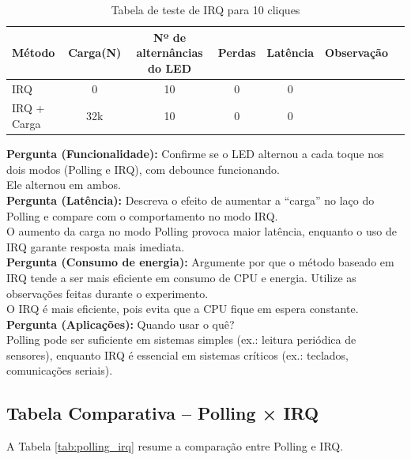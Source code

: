 \documentclass{article}
\begin{document}
\begin{table}[ht!]
    \centering
    \begin{tabular}{lcccccc}
        \toprule
         Método & Carga(N) & Nº de alternâncias do LED & Perdas & Latência & Observação\\
         \midrule
         IRQ & 0 & 10 & 0 & 0 & \\
         IRQ + Carga & 32k & 10 & 0 & 0 & \\
         \bottomrule
    \end{tabular}
    \caption{Tabela de teste de IRQ para 10 cliques}
    \label{tab:irq_compair}
\end{table}

\noindent
\textbf{Pergunta (Funcionalidade):} Confirme se o LED alternou a cada toque nos dois modos (Polling e IRQ), com debounce funcionando. \\

\noindent
Ele alternou em ambos.   \\ 


\noindent
\textbf{Pergunta (Latência):} Descreva o efeito de aumentar a “carga” no laço do Polling e compare com o comportamento no modo IRQ. \\

\noindent
O aumento da carga no modo Polling provoca maior latência, enquanto o uso de IRQ garante resposta mais imediata.   \\

\noindent
\textbf{Pergunta (Consumo de energia):} Argumente por que o método baseado em IRQ tende a ser mais eficiente em consumo de CPU e energia. Utilize as observações feitas durante o experimento. \\

\noindent
O IRQ é mais eficiente, pois evita que a CPU fique em espera constante. \\

\noindent
\textbf{Pergunta (Aplicações):} Quando usar o quê? \\

\noindent
Polling pode ser suficiente em sistemas simples (ex.: leitura periódica de sensores), enquanto IRQ é essencial em sistemas críticos (ex.: teclados, comunicações seriais).  \\

\subsection{Tabela Comparativa -- Polling × IRQ}
A Tabela \ref{tab:polling_irq} resume a comparação entre Polling e IRQ.  
\end{document}
